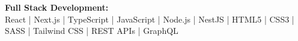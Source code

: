 \textbf{Full Stack Development:} \\ React | Next.js | TypeScript | JavaScript | Node.js | NestJS | HTML5 | CSS3 | SASS | Tailwind CSS | REST APIs | GraphQL